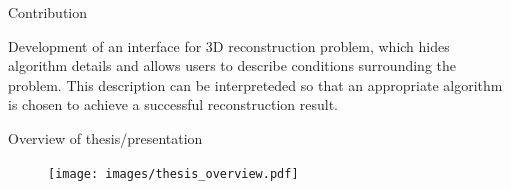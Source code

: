 \documentclass[10pt]{beamer}
\begin{document}
\begin{frame}{Contribution}

Development of an interface for 3D reconstruction problem, which hides algorithm details and allows users to describe conditions surrounding the problem. This description can be interpreteded so that an appropriate algorithm is chosen to achieve a successful reconstruction result.


\end{frame}

\begin{frame}{Overview of thesis/presentation}

\begin{figure}
\centering
\texttt{[image: images/thesis\_overview.pdf]}
\end{figure}

\end{frame}

\end{document}
